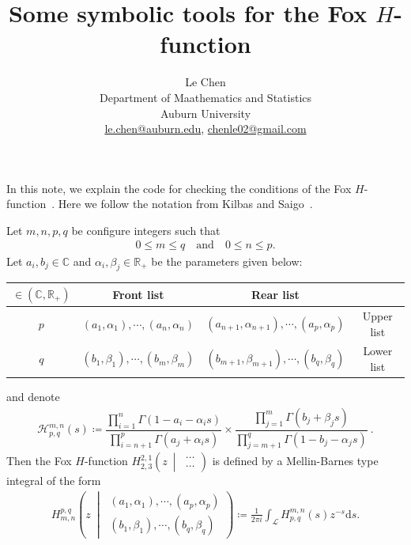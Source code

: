 \documentclass[11pt]{article}
\newcommand{\R}{\mathbb{R}}
\newcommand{\ud}{\ensuremath{\mathrm{d}}}
\newcommand{\FoxH}[5]{H_{#2}^{#1}\left(#3\:\middle\vert\: \begin{array}{l}#4\\[0.4em] #5\end{array}\right)}
\renewcommand{\arraystretch}{1.8}
\begin{document}
\title{Some symbolic tools for the {F}ox {$H$}-function}
\author{Le Chen                             \\
  Department of Maathematics and Statistics \\
  Auburn University                         \\
\url{le.chen@auburn.edu}, \url{chenle02@gmail.com}
}

\maketitle

In this note, we explain the code for checking the conditions of the Fox
$H$-function~\cite{fox:61:g}. Here we follow the notation from Kilbas and
Saigo~\cite{kilbas.saigo:04:h-transforms}. \bigskip


Let $m,n,p,q$ be configure integers such that
\begin{align*}
  0 \le m \le q \quad \text{and} \quad
  0 \le n \le p.
\end{align*}
Let $a_i,b_j\in \mathbb{C}$ and $\alpha_i, \beta_j \in\R_+$ be the parameters given below:
\begin{center}
\renewcommand{\arraystretch}{1.2}
  \begin{tabular}{|c|cc|c|}
    \hline
    $\in \left(\mathbb{C},\R_+\right)$ & Front list                              & Rear list                                       &            \\ \hline
    $p$                                & $(a_1,\alpha_1),\cdots, (a_n,\alpha_n)$ & $(a_{n+1},\alpha_{n+1}),\cdots, (a_p,\alpha_p)$ & Upper list \\
    $q$                                & $(b_1,\beta_1),\cdots, (b_m,\beta_m)$   & $(b_{m+1},\beta_{m+1}),\cdots, (b_q,\beta_q)$   & Lower list \\ \hline
  \end{tabular}
\end{center}
and denote
\begin{align}\label{E:H}
  \mathcal{H}^{m,n}_{p,q}(s) \coloneqq
         \dfrac{ \displaystyle \prod_{i=1}^n\Gamma\left(1-a_i-\alpha_is\right) }{ \displaystyle \prod_{i=n+1}^p\Gamma\left(a_j+\alpha_is\right)    }
  \times \dfrac{ \displaystyle \prod_{j=1}^m\Gamma\left(b_j+\beta_js\right)    }{ \displaystyle \prod_{j=m+1}^q\Gamma\left(1- b_j-\alpha_js\right) }\:.
\end{align}
Then the Fox $H$-function $\FoxH{2,1}{2,3}{z}{\cdots}{\cdots}$ is defined by a Mellin-Barnes type integral of the form
\begin{align}\label{E:Fox-H}
  \FoxH{p,q}{m,n}{z}{(a_1,\alpha_1),\cdots, (a_p,\alpha_p)}{(b_1,\beta_1),\cdots, (b_q,\beta_q)}
  \coloneqq \frac{1}{2\pi i} \int_{\mathcal{L}} H^{m,n}_{p,q}(s) z^{-s} \ud s.
\end{align}
\end{document}

